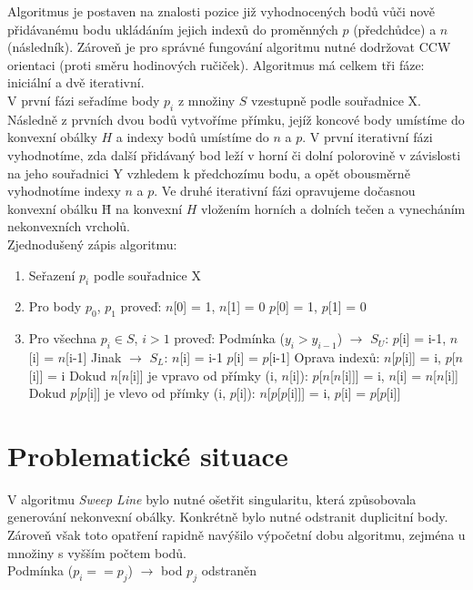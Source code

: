 \documentclass[a4paper, 12pt]{article}
\begin{document}
Algoritmus je postaven na znalosti pozice již vyhodnocených bodů vůči nově přidá\-vanému bodu ukládáním jejich indexů do proměnných $p$ (předchůdce) a $n$ (následník). Zároveň je pro správné fungování algoritmu nutné dodržovat CCW orientaci (proti směru hodinových ručiček). Algoritmus má celkem tři fáze: iniciální a dvě iterativní.\\

V první fázi seřadíme body $p_i$ z množiny $S$ vzestupně podle souřadnice X. Následně z prvních dvou bodů vytvoříme přímku, jejíž koncové body umístíme do konvexní obálky $H$ a indexy bodů umístíme do $n$ a $p$. V první iterativní fázi vyhodnotíme, zda další přidávaný bod leží v horní či dolní polorovině v závislosti na jeho souřadnici Y vzhledem k předchozímu bodu, a opět obousměrně vyhodnotíme indexy $n$ a $p$. Ve druhé iterativní fázi opravujeme dočasnou konvexní obálku \={H} na konvexní $H$ vložením horních a dolních tečen a vynecháním nekonvexních vrcholů.\\

Zjednodušený zápis algoritmu: 
\begin{enumerate}
\item Seřazení $p_i$ podle souřadnice X
\item Pro body $p_0$, $p_1$ proveď:
\subitem $n$[0] = 1, $n$[1] = 0
\subitem $p$[0] = 1, $p$[1] = 0
\item Pro všechna $p_i \in S$, $i > 1$ proveď:
\subitem Podmínka ($y_i > y_{i-1}$) $\rightarrow$ $S_U$: $p$[i] = i-1, $n$[i] = $n$[i-1]
\subitem Jinak $\rightarrow$ $S_L$: $n$[i] = i-1 $p$[i] = $p$[i-1]
\subitem Oprava indexů: $n$[$p$[i]] = i, $p$[$n$[i]] = i
\subitem Dokud $n$[$n$[i]] je vpravo od přímky (i, $n$[i]):
\subsubitem $p$[$n$[$n$[i]]] = i, $n$[i] = $n$[$n$[i]]
\subitem Dokud $p$[$p$[i]] je vlevo od přímky (i, $p$[i]):
\subsubitem $n$[$p$[$p$[i]]] = i, $p$[i] = $p$[$p$[i]]
\end{enumerate}

\section{Problematické situace}
V algoritmu \textit{Sweep Line} bylo nutné ošetřit singularitu, která způsobovala generování nekonvexní obálky. Konkrétně bylo nutné odstranit duplicitní body. Zároveň však toto opatření rapidně navýšilo výpočetní dobu algoritmu, zejména u množiny s vyšším počtem bodů. \\

Podmínka ($p_i == p_j$) $\rightarrow$ bod $p_j$ odstraněn
\end{document}
